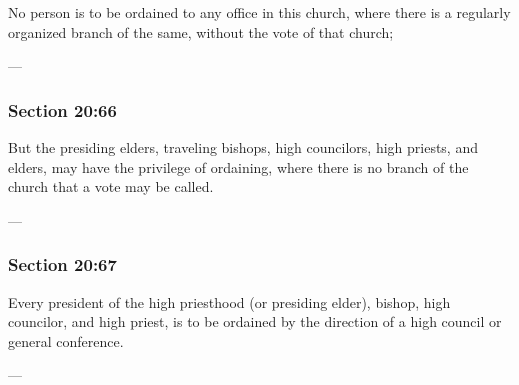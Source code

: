 		No person is to be ordained to any office in this church, where there is a regularly organized branch of the same, without the vote of that church;

		\begin{framed}
		\scriptsize
			\begin{compactdesc}
				\item[JSP] ---
				\item[RB1] 
				\item[BC] 
			\end{compactdesc}
		\end{framed}

	\subsubsection{Section 20:66} %
		\label{DC20-66}

		But the presiding elders, traveling bishops, high councilors, high priests, and elders, may have the privilege of ordaining, where there is no branch of the church that a vote may be called.

		\begin{framed}
		\scriptsize
			\begin{compactdesc}
				\item[JSP] ---
				\item[RB1] 
				\item[BC] 
			\end{compactdesc}
		\end{framed}

	\subsubsection{Section 20:67} %
		\label{DC20-67}

		Every president of the high priesthood (or presiding elder), bishop, high councilor, and high priest, is to be ordained by the direction of a high council or general conference.

		\begin{framed}
		\scriptsize
			\begin{compactdesc}
				\item[JSP] ---
				\item[RB1] 
				\item[BC] 
			\end{compactdesc}
		\end{framed}

